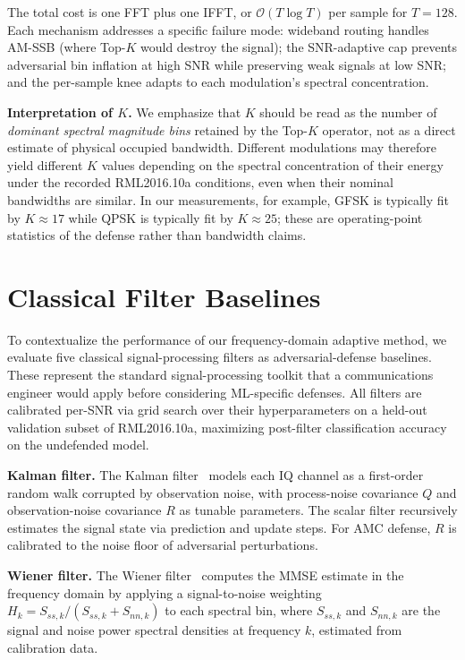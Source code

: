 The total cost is one FFT plus one IFFT, or $\mathcal{O}(T \log T)$ per
sample for $T = 128$. Each mechanism addresses a specific failure mode:
wideband routing handles AM-SSB (where Top-$K$ would destroy the signal);
the SNR-adaptive cap prevents adversarial bin inflation at high SNR while
preserving weak signals at low SNR; and the per-sample knee adapts to each
modulation's spectral concentration.

\textbf{Interpretation of $K$.}
We emphasize that $K$ should be read as the number of \emph{dominant
spectral magnitude bins} retained by the Top-$K$ operator, not as a direct
estimate of physical occupied bandwidth. Different modulations may therefore
yield different $K$ values depending on the spectral concentration of their
energy under the recorded RML2016.10a conditions, even when their nominal
bandwidths are similar. In our measurements, for example, GFSK is typically
fit by $K \approx 17$ while QPSK is typically fit by $K \approx 25$; these
are operating-point statistics of the defense rather than bandwidth claims.

\section{Classical Filter Baselines}
\label{sec:classical}

To contextualize the performance of our frequency-domain adaptive method,
we evaluate five classical signal-processing filters as adversarial-defense
baselines. These represent the standard signal-processing toolkit that a
communications engineer would apply before considering ML-specific defenses.
All filters are calibrated per-SNR via grid search over their hyperparameters
on a held-out validation subset of RML2016.10a, maximizing post-filter
classification accuracy on the undefended model.

\textbf{Kalman filter.}
The Kalman filter~\cite{kalman1960new} models each IQ channel as a
first-order random walk corrupted by observation noise, with process-noise
covariance $Q$ and observation-noise covariance $R$ as tunable parameters.
The scalar filter recursively estimates the signal state via prediction and
update steps. For AMC defense, $R$ is calibrated to the noise floor of
adversarial perturbations.

\textbf{Wiener filter.}
The Wiener filter~\cite{wiener1949extrapolation} computes the MMSE estimate
in the frequency domain by applying a signal-to-noise weighting
$H_k = S_{ss,k} / (S_{ss,k} + S_{nn,k})$ to each spectral bin, where
$S_{ss,k}$ and $S_{nn,k}$ are the signal and noise power spectral densities
at frequency $k$, estimated from calibration data.

